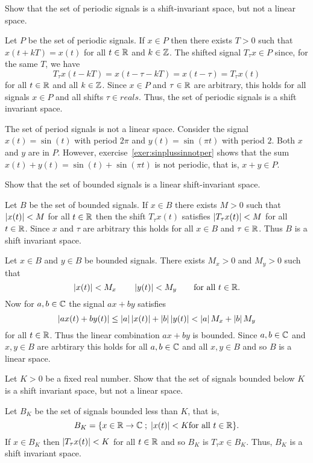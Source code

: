 \begin{excersizelist}
\item \label{exer:periodicshiftinvariantnotlinear} Show that the set of periodic signals is a shift-invariant space, but not a linear space.
\begin{solution}
Let $P$ be the set of periodic signals.  If $x \in P$ then there exists $T > 0$ such that $x(t + kT) = x(t)$ for all $t \in {\mathbb R}$ and $k \in {\mathbb Z}$.  The shifted signal $T_\tau x \in P$ since, for the same $T$, we have
\[
T_\tau x(t - kT) = x(t - \tau - kT) = x(t - \tau) = T_\tau x(t)
\]
for all $t \in {\mathbb R}$ and all $k \in {\mathbb Z}$.  Since $x \in P$ and $\tau \in {\mathbb R}$ are arbitrary, this holds for all signals $x \in P$ and all shifts $\tau \in reals$.   Thus, the set of periodic signals is a shift invariant space.

The set of period signals is not a linear space.  Consider the signal $x(t) = \sin(t)$ with period $2\pi$ and $y(t) = \sin(\pi t)$ with period $2$.  Both $x$ and $y$ are in $P$.  However, exercise~\ref{exer:sinplussinnotper} shows that the sum $x(t) + y(t) = \sin(t) + \sin(\pi t)$ is not periodic, that is, $x + y \in P$.
\end{solution}

\item \label{exer:boundedlinearshiftinvar} Show that the set of bounded signals is a linear shift-invariant space.
\begin{solution}
Let $B$ be the set of bounded signals.  If $x \in B$ there exists $M > 0$ such that $\left\vert x(t) \right\vert < M$ for all $t \in {\mathbb R}$ then the shift $T_\tau x(t)$ satisfies $\left\vert T_\tau x(t) \right\vert < M$ for all $t \in {\mathbb R}$.  Since $x$ and $\tau$ are arbitrary this holds for all $x \in B$ and $\tau \in {\mathbb R}$.  Thus $B$ is a shift invariant space.

Let $x \in B$ and $y \in B$ be bounded signals.  There exists $M_x > 0$ and $M_y > 0$ such that
\[
\left\vert x(t) \right\vert < M_x \qquad \left\vert y(t) \right\vert < M_y \qquad \text{for all $t \in {\mathbb R}$}.
\]
Now for $a, b \in {\mathbb C}$ the signal $ax + by$ satisfies
\[
\left\vert ax(t) + by(t) \right\vert \leq \left\vert a \right\vert\left\vert x(t) \right\vert + \left\vert b \right\vert\left\vert y(t) \right\vert < \left\vert a \right\vert M_x + \left\vert b \right\vert M_y
\]
for all $t \in {\mathbb R}$.  Thus the linear combination $ax+by$ is bounded.  Since $a,b \in {\mathbb C}$ and $x,y \in B$ are arbtirary this holds for all $a,b \in {\mathbb C}$ and all $x,y \in B$ and so $B$ is a linear space. 
\end{solution}

\item \label{exer:boundconstantnotlinear} Let $K > 0$ be a fixed real number. Show that the set of signals bounded below $K$ is a shift invariant space, but not a linear space. 
\begin{solution}
Let $B_K$ be the set of signals bounded less than $K$, that is,
\[
B_K = \{ x \in {\mathbb R} \to {\mathbb C} \; ; \; \left\vert x(t) \right\vert < K \text{for all $t \in {\mathbb R}$} \}.
\]
If $x \in B_K$ then $\left\vert T_\tau x(t) \right\vert < K$ for all $t \in {\mathbb R}$ and so $B_K$ is $T_\tau x \in B_K$.  Thus, $B_K$ is a shift invariant space.


\end{solution}
\end{excersizelist}
